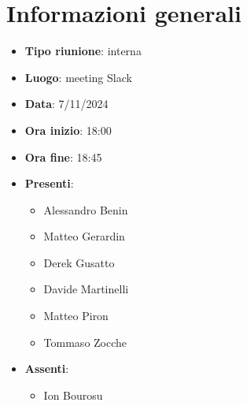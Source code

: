 \section{Informazioni generali}
\begin{itemize}
  \item \textbf{Tipo riunione}: interna
  \item \textbf{Luogo}: meeting Slack
  \item \textbf{Data}: 7/11/2024
  \item \textbf{Ora inizio}: 18:00
  \item \textbf{Ora fine}: 18:45
  
  \item \textbf{Presenti}:
  \begin{itemize}
    \item Alessandro Benin
    \item Matteo Gerardin
    \item Derek Gusatto
    \item Davide Martinelli
    \item Matteo Piron
    \item Tommaso Zocche
  \end{itemize}

  \item \textbf{Assenti}:
    \begin{itemize}
        \item Ion Bourosu
    \end{itemize}
 
\end{itemize}